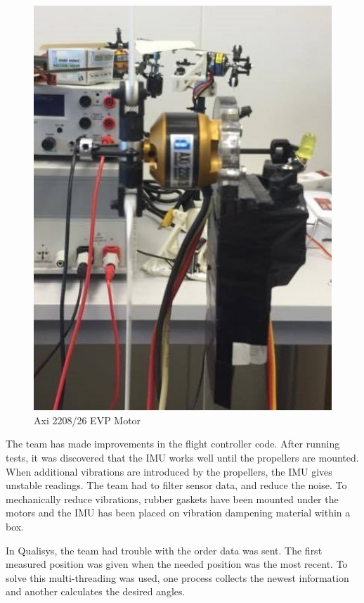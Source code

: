 \begin{figure}[h]
\begin{minipage}[b]{0.4\textwidth}
            \includegraphics[width = 1\textwidth]{VAPIQ-PICTURES/axi2208}
            \caption{Axi 2208/26 EVP Motor}
            \label{fig:aximotor}
        \end{minipage}
\end{figure}

The team has made improvements in the flight controller code. After running tests, it was discovered that the IMU works well until the propellers are mounted. When additional vibrations are introduced by the propellers, the IMU gives unstable readings. The team had to filter sensor data, and reduce the noise. To mechanically reduce vibrations, rubber gaskets have been mounted under the motors and the IMU has been placed on vibration dampening material within a box. \bigskip

\clearpage

In Qualisys, the team had trouble with the order data was sent. The first measured position was given when the needed position was the most recent. To solve this multi-threading was used, one process collects the newest information and another calculates the desired angles. \bigskip

